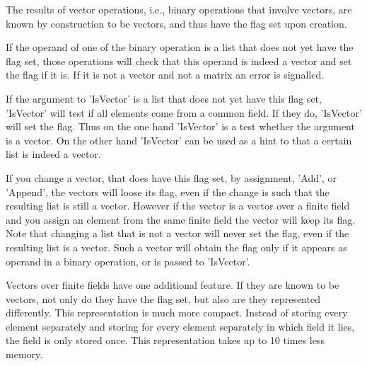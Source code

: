 The results of  vector  operations, i.e., binary operations  that involve
vectors, are known by construction to be  vectors, and thus have the flag
set upon creation.

If the operand of one of the binary operation is a list that does not yet
have the   flag set, those operations will   check  that this  operand is
indeed a vector and set the flag if it is.  If it is not a vector and not
a matrix an error is signalled.

If the argument to 'IsVector' is a list that does not  yet have this flag
set, 'IsVector' will  test if all elements come  from a common field.  If
they do, 'IsVector'  will set the flag.   Thus on the one hand 'IsVector'
is a test whether the argument is a vector.  On the other hand 'IsVector'
can be used as a hint to {\GAP} that a certain list is indeed a vector.

If you  change  a vector, that does   have this flag set,  by assignment,
'Add', or  'Append', the vectors will loose  its flag, even if the change
is such that the resulting list is still a vector.  However if the vector
is a vector over a finite  field and you assign an  element from the same
finite field  the vector will keep its  flag.  Note that changing  a list
that is not a vector will never set the  flag, even if the resulting list
is  a vector.  Such a vector  will obtain the flag  only if it appears as
operand in a binary operation, or is passed to 'IsVector'.

Vectors over  finite fields  have  one additional feature.   If  they are
known  to be  vectors, not only do  they have  the flag set, but also are
they represented differently.  This representation is much  more compact.
Instead of storing every element separately and storing for every element
separately in which field it lies, the field is only  stored once.   This
representation takes up to 10 times less memory.




